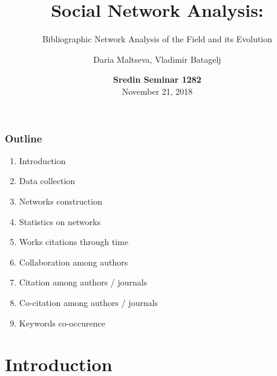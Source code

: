 \documentclass[hyperref={pdfstartview={FitBH -32768},
                         pdfpagemode=FullScreen,
                         plainpages=false,
                         colorlinks=true}
              ]{beamer}
\title[SNA. Bibliographic Network Analysis]{\textbf{Social Network Analysis:}}\subtitle{Bibliographic Network Analysis of the Field and its Evolution}
\author[D. Maltseva, V. Batagelj]{Daria Maltseva, Vladimir Batagelj}
\institute[IMFM \& IAM UP]{IMFM Ljubljana, IAM UP Koper and NRU HSE Moscow }
\date[November 21, 2018]{\small
\textcolor{BrickRed}{\textbf{Sredin Seminar 1282}} \\
November 21, 2018}
\newcommand{\clock}{\count254=\time \divide\count254 by 60
 \count255=\count254 \multiply\count255 by -60
 \advance\count255 by \time
 \ifnum\count254<10 0\fi\number\count254\,:\,%
 \ifnum\count255<10 0\fi\number\count255}
\begin{document}

\frame{\maketitle}

\begin{frame}
\frametitle{Outline}
\small
\begin{enumerate}
\item Introduction 
\item Data collection 
\item Networks construction 
\item Statistics on networks
\item Works citations through time
\item Collaboration among authors
\item Citation among authors / journals
\item Co-citation among authors / journals
\item Keywords co-occurence
\end{enumerate}




\end{frame}

\section{Introduction}
\end{document}
